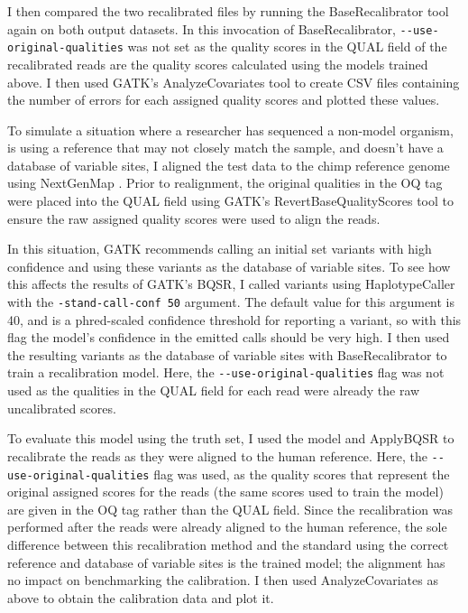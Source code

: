I then compared the two recalibrated files by running the BaseRecalibrator tool again on both output datasets. In this invocation of BaseRecalibrator, \texttt{-\phantom{}-use-original-qualities} was not set as the quality scores in the QUAL field of the recalibrated reads are the quality scores calculated using the models trained above. I then used GATK's AnalyzeCovariates tool to create CSV files containing the number of errors for each assigned quality scores and plotted these values.

To simulate a situation where a researcher has sequenced a non-model organism, is using a reference that may not closely match the sample, and doesn't have a database of variable sites, I aligned the test data to the chimp reference genome \parencite{waterson_initial_2005} using NextGenMap \parencite{sedlazeck_nextgenmap_2013}. Prior to realignment, the original qualities in the OQ tag were placed into the QUAL field using GATK's RevertBaseQualityScores tool to ensure the raw assigned quality scores were used to align the reads.

In this situation, GATK recommends calling an initial set variants with high confidence and using these variants as the database of variable sites. %
To see how this affects the results of GATK's BQSR, I called variants using HaplotypeCaller with the \texttt{-stand-call-conf 50} argument. The default value for this argument is 40, and is a phred-scaled confidence threshold for reporting a variant, so with this flag the model's confidence in the emitted calls should be very high. I then used the resulting variants as the database of variable sites with BaseRecalibrator to train a recalibration model. Here, the \texttt{-\phantom{}-use-original-qualities} flag was not used as the qualities in the QUAL field for each read were already the raw uncalibrated scores.

To evaluate this model using the truth set, I used the model and ApplyBQSR to recalibrate the reads as they were aligned to the human reference. Here, the \texttt{-\phantom{}-use-original-qualities} flag was used, as the quality scores that represent the original assigned scores for the reads (the same scores used to train the model) are given in the OQ tag rather than the QUAL field. Since the recalibration was performed after the reads were already aligned to the human reference, the sole difference between this recalibration method and the standard using the correct reference and database of variable sites is the trained model; the alignment has no impact on benchmarking the calibration. I then used AnalyzeCovariates as above to obtain the calibration data and plot it.

